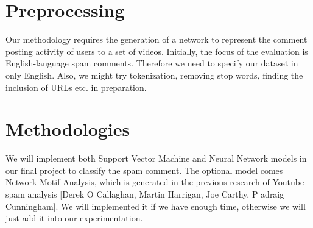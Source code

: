 \documentclass [a4paper, 11pt, oneside, final]{article}
\numberwithin{equation}{section}		%
\numberwithin{figure}{section}			%
\numberwithin{table}{section}				%
\begin{document}
\section{Preprocessing}
Our methodology requires the generation of a network to represent the comment posting activity of users to a set of videos.  Initially, the focus of the evaluation is English-language spam comments. Therefore we need to specify our dataset in only English. Also, we might try tokenization, removing stop words, finding the inclusion of URLs etc. in preparation.

\section{Methodologies}
We will implement both Support Vector Machine and Neural Network models in our final project to classify the spam comment. The optional model comes Network Motif Analysis, which is generated in the previous research of Youtube spam analysis [Derek O Callaghan, Martin Harrigan, Joe Carthy, P adraig Cunningham]. We will implemented it if we have enough time, otherwise we will just add it into our experimentation.
\end{document}
